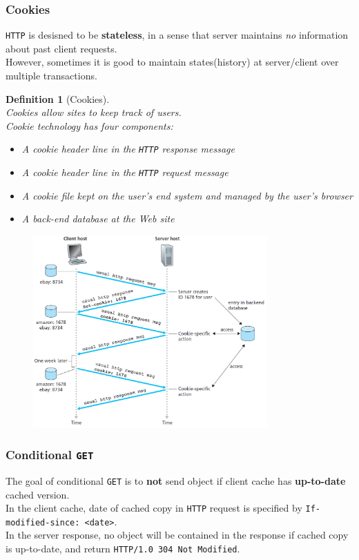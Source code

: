 \documentclass[12pt]{article}
\newtheorem{definition}{Definition}[section]
\theoremstyle{definition}
\begin{document}
\subsubsection{Cookies}
\texttt{HTTP} is desisned to be \textbf{stateless}, in a sense that server maintains \textit{no} information about past client requests.\\
However, sometimes it is good to maintain states(history) at server/client over multiple transactions.
\begin{definition}[Cookies]
\hfill\\\normalfont Cookies allow sites to keep track of users.\\Cookie technology has four components:
\begin{itemize}
  \item A cookie header line in the \texttt{HTTP} response message
  \item A cookie header line in the \texttt{HTTP} request message
  \item A cookie file kept on the user's end system and managed by the user's browser
  \item A back-end database at the Web site
\end{itemize}
\begin{figure}[h]
\centering
\includegraphics[width = 0.8\textwidth]{2_2_2.png}
\end{figure}
\end{definition}
\subsubsection{Conditional \texttt{GET}}
The goal of conditional \texttt{GET} is to \textbf{not} send object if client cache has \textbf{up-to-date} cached version.\\
In the client cache, date of cached copy in \texttt{HTTP} request is specified by \texttt{If-modified-since: <date>}.\\
In the server response, no object will be contained in the response if cached copy is up-to-date, and return \texttt{HTTP/1.0 304 Not Modified}.
\end{document}
